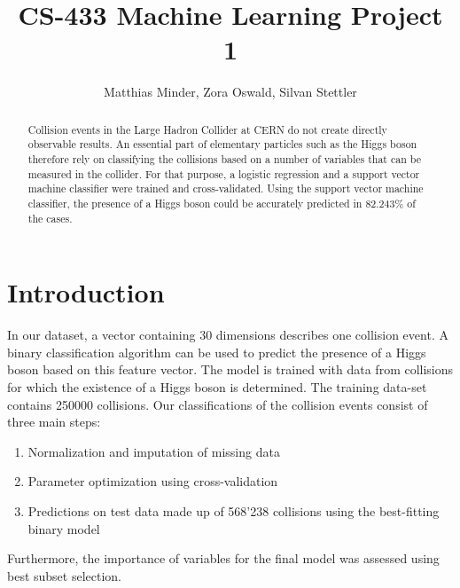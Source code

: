 \documentclass[10pt,conference,compsocconf]{IEEEtran}
\begin{document}
\title{CS-433 Machine Learning Project 1}

\author{
  Matthias Minder, Zora Oswald, Silvan Stettler\\
  
}

\maketitle

\begin{abstract}
Collision events in the Large Hadron Collider at CERN do not create directly observable results. An essential part of elementary particles such as the Higgs boson therefore rely on classifying the collisions based on a number of variables that can be measured in the collider. For that purpose, a logistic regression and a support vector machine classifier were trained and cross-validated. Using the support vector machine classifier, the presence of a Higgs boson could be accurately predicted in 82.243\% of the cases.  
\end{abstract}

\section*{Introduction} 
In our dataset, a vector containing 30 dimensions describes one collision event. A binary classification algorithm can be used to predict the presence of a Higgs boson based on this feature vector. The model is trained with data from collisions for which the existence of a Higgs boson is determined. The training data-set contains 250000 collisions.
Our classifications of the collision events consist of three main steps:
\begin{enumerate}
\item Normalization and imputation of missing data 
\item Parameter optimization using cross-validation
\item Predictions on test data made up of 568'238 collisions using the best-fitting binary model 
\end{enumerate}
Furthermore, the importance of variables for the final model was assessed using best subset selection.
\end{document}

